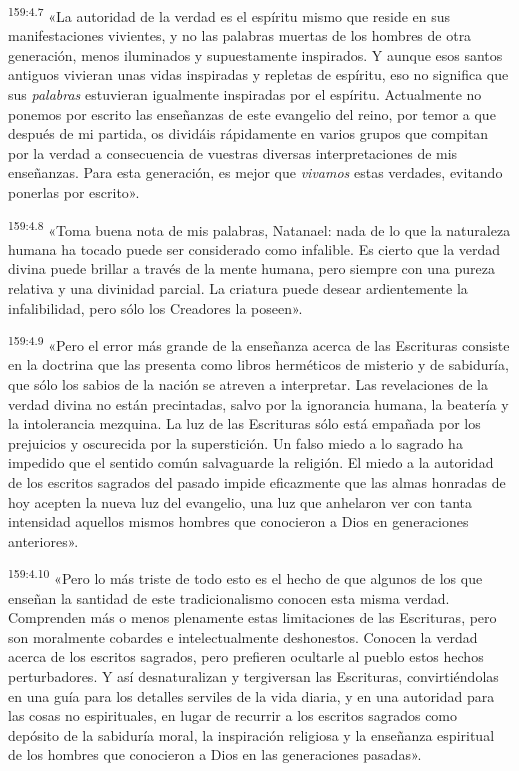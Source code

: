 \par
\textsuperscript{159:4.7} «La autoridad de la verdad es el espíritu mismo que reside en sus manifestaciones vivientes, y no las palabras muertas de los hombres de otra generación, menos iluminados y supuestamente inspirados. Y aunque esos santos antiguos vivieran unas vidas inspiradas y repletas de espíritu, eso no significa que sus \textit{palabras} estuvieran igualmente inspiradas por el espíritu. Actualmente no ponemos por escrito las enseñanzas de este evangelio del reino, por temor a que después de mi partida, os dividáis rápidamente en varios grupos que compitan por la verdad a consecuencia de vuestras diversas interpretaciones de mis enseñanzas. Para esta generación, es mejor que \textit{vivamos} estas verdades, evitando ponerlas por escrito».

\par
\textsuperscript{159:4.8} «Toma buena nota de mis palabras, Natanael: nada de lo que la naturaleza humana ha tocado puede ser considerado como infalible. Es cierto que la verdad divina puede brillar a través de la mente humana, pero siempre con una pureza relativa y una divinidad parcial. La criatura puede desear ardientemente la infalibilidad, pero sólo los Creadores la poseen».

\par
\textsuperscript{159:4.9} «Pero el error más grande de la enseñanza acerca de las Escrituras consiste en la doctrina que las presenta como libros herméticos de misterio y de sabiduría, que sólo los sabios de la nación se atreven a interpretar. Las revelaciones de la verdad divina no están precintadas, salvo por la ignorancia humana, la beatería y la intolerancia mezquina. La luz de las Escrituras sólo está empañada por los prejuicios y oscurecida por la superstición. Un falso miedo a lo sagrado ha impedido que el sentido común salvaguarde la religión. El miedo a la autoridad de los escritos sagrados del pasado impide eficazmente que las almas honradas de hoy acepten la nueva luz del evangelio, una luz que anhelaron ver con tanta intensidad aquellos mismos hombres que conocieron a Dios en generaciones anteriores».

\par
\textsuperscript{159:4.10} «Pero lo más triste de todo esto es el hecho de que algunos de los que enseñan la santidad de este tradicionalismo conocen esta misma verdad. Comprenden más o menos plenamente estas limitaciones de las Escrituras, pero son moralmente cobardes e intelectualmente deshonestos. Conocen la verdad acerca de los escritos sagrados, pero prefieren ocultarle al pueblo estos hechos perturbadores. Y así desnaturalizan y tergiversan las Escrituras, convirtiéndolas en una guía para los detalles serviles de la vida diaria, y en una autoridad para las cosas no espirituales, en lugar de recurrir a los escritos sagrados como depósito de la sabiduría moral, la inspiración religiosa y la enseñanza espiritual de los hombres que conocieron a Dios en las generaciones pasadas».

